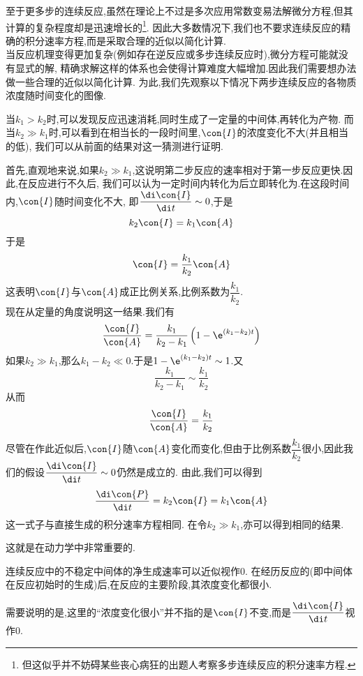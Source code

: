 \documentclass{ctexart}
\begin{document}
至于更多步的连续反应,虽然在理论上不过是多次应用常数变易法解微分方程,但其计算的复杂程度却是迅速增长的\footnote{但这似乎并不妨碍某些丧心病狂的出题人考察多步连续反应的积分速率方程.}.%
因此大多数情况下,我们也不要求连续反应的精确的积分速率方程,而是采取合理的近似以简化计算.\vspace{4pt}\\
\indent 当反应机理变得更加复杂(例如存在逆反应或多步连续反应时),微分方程可能就没有显式的解,%
精确求解这样的体系也会使得计算难度大幅增加.因此我们需要想办法做一些合理的近似以简化计算.%
为此,我们先观察以下情况下两步连续反应的各物质浓度随时间变化的图像.
\begin{figure}[H]
    \centering
\end{figure}
当$k_1>k_2$时,可以发现反应迅速消耗,同时生成了一定量的中间体,再转化为产物.%
而当$k_2\gg k_1$时,可以看到在相当长的一段时间里,$\con{I}$的浓度变化不大(并且相当的低),%
我们可以从前面的结果对这一猜测进行证明.
\begin{derivation}
    首先,直观地来说,如果$k_2\gg k_1$,这说明第二步反应的速率相对于第一步反应更快.因此,在反应进行不久后,%
    我们可以认为一定时间内转化为后立即转化为.在这段时间内,$\con{I}$随时间变化不大,%
    即$\dfrac{\di\con{I}}{\di t}\sim0$,于是
    \[k_2\con{I}=k_1\con{A}\]
    于是
    \[\con{I}=\dfrac{k_1}{k_2}\con{A}\]
    这表明$\con{I}$与$\con{A}$成正比例关系,比例系数为$\dfrac{k_1}{k_2}$.\\
    现在从定量的角度说明这一结果.我们有
    \[\dfrac{\con{I}}{\con{A}}=\dfrac{k_1}{k_2-k_1}\left(1-\e^{\left(k_1-k_2\right)t}\right)\]
    如果$k_2\gg k_1$,那么$k_1-k_2\ll0$.于是$1-\e^{\left(k_1-k_2\right)t}\sim1$.又
    \[\dfrac{k_1}{k_2-k_1}\sim\dfrac{k_1}{k_2}\]
    从而
    \[\dfrac{\con{I}}{\con{A}}=\dfrac{k_1}{k_2}\]
    尽管在作此近似后,$\con{I}$随$\con{A}$变化而变化,但由于比例系数$\dfrac{k_1}{k_2}$很小,因此我们的假设$\dfrac{\di\con{I}}{\di t}\sim0$仍然是成立的.%
    由此,我们可以得到
    \[\dfrac{\di\con{P}}{\di t}=k_2\con{I}=k_1\con{A}\]
    这一式子与直接生成的积分速率方程相同.%
    在令$k_2\gg k_1$,亦可以得到相同的结果.
\end{derivation}
这就是在动力学中非常重要的.
\begin{theorem}[7C.2.2 稳态近似]
    连续反应中的不稳定中间体的净生成速率可以近似视作$0$.%
    在经历反应的(即中间体在反应初始时的生成)后,在反应的主要阶段,其浓度变化都很小.
\end{theorem}
需要说明的是,这里的“浓度变化很小”并不指的是$\con{I}$不变,而是$\dfrac{\di\con{I}}{\di t}$视作$0$.%
\end{document}
